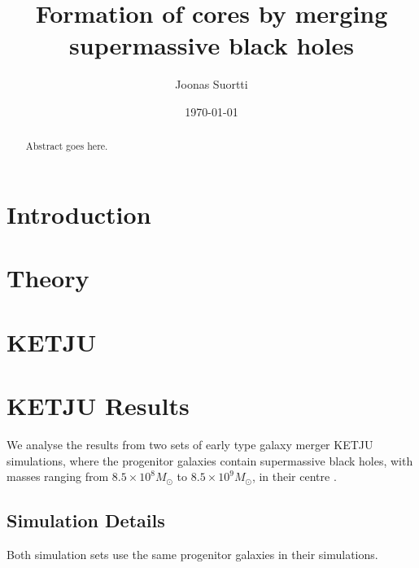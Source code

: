 \documentclass[english, oneside]{HYgradu}
\title{Formation of cores by merging supermassive black holes}
\author{Joonas Suortti}
\date{\today}
\begin{document}
\maketitle

\begin{abstract}
Abstract goes here.
\end{abstract}

\mytableofcontents



\chapter{Introduction}

\chapter{Theory}

\chapter{KETJU}

\chapter{KETJU Results}

We analyse the results from two sets of early type galaxy merger KETJU simulations, where the progenitor galaxies contain supermassive black holes, with masses ranging from $8.5 \times 10^8 M_\odot$ to $8.5 \times 10^9 M_\odot$, in their centre \citep{Mannerkoski2019, Rantala2018}. 

\section{Simulation Details}

Both simulation sets use the same progenitor galaxies in their simulations.
\end{document}
